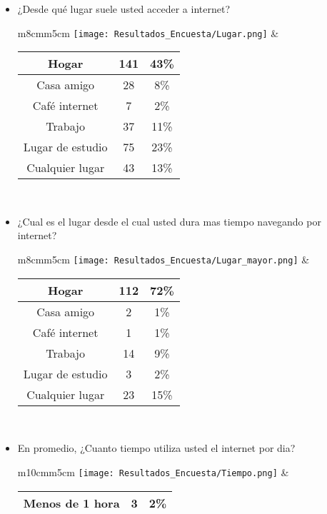 \begin{itemize}
\begin{tabular}{m{7cm}m{5cm}}
      \end{tabular}
  \item ¿Desde qué lugar suele usted acceder a internet? \\
      \begin{tabular}{m{8cm}m{5cm}}
        \texttt{[image: Resultados\_Encuesta/Lugar.png]} &
        \begin{tabular}{|c|cc|}
        \hline
         Hogar & 141 & 43\% \\ \hline
         Casa amigo & 28 & 8\% \\ \hline
         Café internet & 7 & 2\% \\ \hline
         Trabajo & 37 & 11\% \\ \hline
         Lugar de estudio & 75 & 23\% \\ \hline
         Cualquier lugar & 43 & 13\% \\ \hline
        \end{tabular} \\
      \end{tabular}
  \item ¿Cual es el lugar desde el cual usted dura mas tiempo navegando por internet? \\
      \begin{tabular}{m{8cm}m{5cm}}
        \texttt{[image: Resultados\_Encuesta/Lugar\_mayor.png]} &
        \begin{tabular}{|c|cc|}
        \hline
         Hogar & 112 & 72\% \\ \hline
         Casa amigo & 2 & 1\% \\ \hline
         Café internet & 1 & 1\% \\ \hline
         Trabajo & 14 & 9\% \\ \hline
         Lugar de estudio & 3 & 2\% \\ \hline
         Cualquier lugar & 23 & 15\% \\ \hline
        \end{tabular} \\
      \end{tabular}
  \item En promedio, ¿Cuanto tiempo utiliza usted el internet por dia? \\
      \begin{tabular}{m{10cm}m{5cm}}
        \texttt{[image: Resultados\_Encuesta/Tiempo.png]} &
        \begin{tabular}{|c|cc|}
        \hline
         Menos de 1 hora & 3 & 2\% \\ \hline

\end{tabular}
\end{tabular}
\end{itemize}
